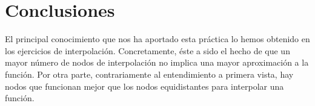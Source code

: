 \documentclass[a4paper]{article}
\begin{document}
\section*{Conclusiones}
El principal conocimiento que nos ha aportado esta práctica lo hemos obtenido en los ejercicios de interpolación. Concretamente, éste a sido el hecho de que un mayor número de nodos de interpolación no implica una mayor aproximación a la función. Por otra parte, contrariamente al entendimiento a primera vista, hay nodos que funcionan mejor que los nodos equidistantes para interpolar una función.
\end{document}
